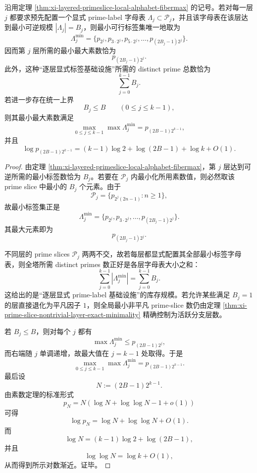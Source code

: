 \begin{corollary}\label{cor:xi-layered-primeslice-inventory-prime-index-formula}
沿用定理 \ref{thm:xi-layered-primeslice-local-alphabet-fibermax} 的记号。若对每一层 \(j\) 都要求预先配置一个显式 prime-label 字母表 \(\Lambda_j\subset\mathcal P_j\)，并且该字母表在该层达到最小可逆规模 \(|\Lambda_j|=B_j\)，则最小可行标签集唯一地取为
\[
\Lambda_j^{\min}
=
\{p_{2^j},p_{3\cdot 2^j},p_{5\cdot 2^j},\dots,p_{(2B_j-1)2^j}\}.
\]
因而第 \(j\) 层所需的最小最大素数恰为
\[
p_{(2B_j-1)2^j}.
\]
此外，这种“逐层显式标签基础设施”所需的 distinct prime 总数恰为
\[
\sum_{j=0}^{k-1}B_j.
\]
若进一步存在统一上界
\[
B_j\le B\qquad(0\le j\le k-1),
\]
则其最小最大素数满足
\[
\max_{0\le j\le k-1}\max \Lambda_j^{\min}
=
p_{(2B-1)2^{k-1}},
\]
并且
\[
\log p_{(2B-1)2^{k-1}}
=
(k-1)\log 2+\log(2B-1)+\log k+O(1).
\]
\end{corollary}
\begin{proof}
由定理 \ref{thm:xi-layered-primeslice-local-alphabet-fibermax}，第 \(j\) 层达到可逆所需的最小标签数恰为 \(B_j\)。若要在 \(\mathcal P_j\) 内最小化所用素数值，则必然取该 prime slice 中最小的 \(B_j\) 个元素。由于
\[
\mathcal P_j=\{p_{2^j(2n-1)}:n\ge 1\},
\]
故最小标签集正是
\[
\Lambda_j^{\min}
=
\{p_{2^j},p_{3\cdot 2^j},\dots,p_{(2B_j-1)2^j}\}.
\]
其最大元素即为
\[
p_{(2B_j-1)2^j}.
\]

不同层的 prime slices \(\mathcal P_j\) 两两不交，故若每层都显式配置其全部最小标签字母表，则全塔所需 distinct primes 数正好是各层字母表大小之和：
\[
\sum_{j=0}^{k-1}|\Lambda_j^{\min}|=\sum_{j=0}^{k-1}B_j.
\]
这给出的是“逐层显式 prime-label 基础设施”的库存规模。若允许某些满足 \(B_j=1\) 的层直接退化为平凡因子 \(1\)，则全局最小非平凡 prime-slice 数仍由定理 \ref{thm:xi-prime-slice-nontrivial-layer-exact-minimality} 精确控制为活跃分支层数。

若 \(B_j\le B\)，则对每个 \(j\) 都有
\[
\max \Lambda_j^{\min}\le p_{(2B-1)2^j},
\]
而右端随 \(j\) 单调递增，故最大值在 \(j=k-1\) 处取得。于是
\[
\max_{0\le j\le k-1}\max \Lambda_j^{\min}=p_{(2B-1)2^{k-1}}.
\]
最后设
\[
N:=(2B-1)2^{k-1}.
\]
由素数定理的标准形式
\[
p_N=N(\log N+\log\log N-1+o(1))
\]
可得
\[
\log p_N=\log N+\log\log N+O(1).
\]
而
\[
\log N=(k-1)\log 2+\log(2B-1),
\]
并且
\[
\log\log N=\log k+O(1),
\]
从而得到所示对数渐近。证毕。
\end{proof}

